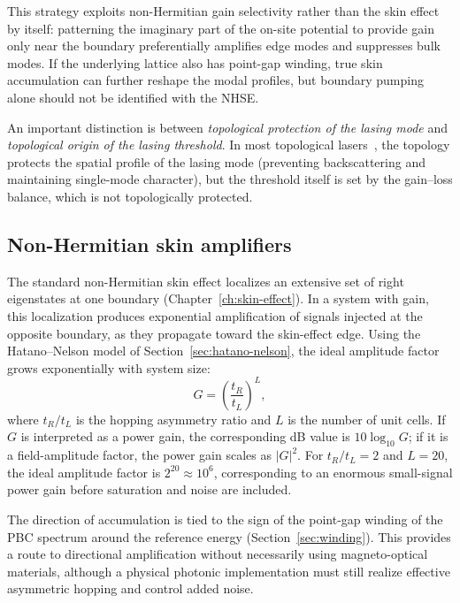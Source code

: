 This strategy exploits non-Hermitian gain selectivity rather than the
skin effect by itself: patterning the imaginary part of the on-site
potential to provide gain only near the boundary preferentially amplifies
edge modes and suppresses bulk modes. If the underlying lattice also has
point-gap winding, true skin accumulation can further reshape the modal
profiles, but boundary pumping alone should not be identified with the
NHSE.

An important distinction is between \emph{topological protection of
the lasing mode} and \emph{topological origin of the lasing
threshold}. In most topological lasers~\cite{ota2020active,zhu2026topology,al2024topological}, the topology protects the
spatial profile of the lasing mode (preventing backscattering and
maintaining single-mode character), but the threshold itself is set by
the gain--loss balance, which is not topologically protected.

\subsection{Non-Hermitian skin amplifiers}
\label{ssec:skin-amplifier}

The standard non-Hermitian skin effect localizes an extensive set of
right eigenstates at one boundary
(Chapter~\ref{ch:skin-effect}). In a system with gain, this
localization produces exponential amplification of signals injected at
the opposite boundary, as they propagate toward the skin-effect edge.
Using the Hatano--Nelson model of Section~\ref{sec:hatano-nelson}, the
ideal amplitude factor grows exponentially with system size:
\begin{equation}
 G = \left(\frac{t_R}{t_L}\right)^L,
 \label{eq:skin-gain}
\end{equation}
where $t_R/t_L$ is the hopping asymmetry ratio and $L$ is the number of
unit cells. If $G$ is interpreted as a power gain, the corresponding dB
value is $10\log_{10}G$; if it is a field-amplitude factor, the power
gain scales as $|G|^2$. For $t_R/t_L=2$ and $L=20$, the ideal amplitude
factor is $2^{20}\approx10^6$, corresponding to an enormous small-signal
power gain before saturation and noise are included.

The direction of accumulation is tied to the sign of the point-gap
winding of the PBC spectrum around the reference energy
(Section~\ref{sec:winding}). This provides a route to directional
amplification without necessarily using magneto-optical materials,
although a physical photonic implementation must still realize effective
asymmetric hopping and control added noise.

